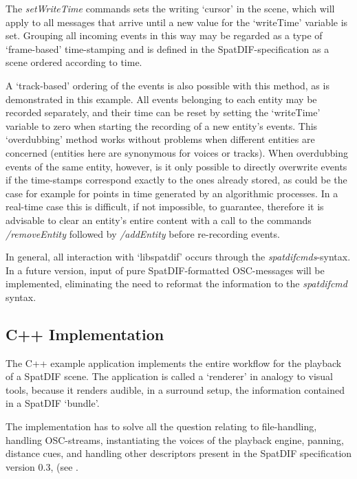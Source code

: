 \documentclass{article}
\begin{document}
The \emph{setWriteTime} commands sets the writing `cursor' in the scene, which will apply to all messages that arrive until a new value for the `writeTime' variable is set.
Grouping all incoming events in this way may be regarded as a type of `frame-based' time-stamping and is defined in the SpatDIF-specification as a scene ordered according to time.

A `track-based' ordering of the events is also possible with this method, as is demonstrated in this example.
All events belonging to each entity may be recorded separately, and their time can be reset by setting the `writeTime' variable to zero when starting the recording of a new entity's events.
This `overdubbing' method works without problems when different entities are concerned (entities here are synonymous for voices or tracks).
When overdubbing events of the same entity, however, is it only possible to directly overwrite events if the time-stamps correspond exactly to the ones already stored, as could be the case for example for points in time generated by an algorithmic processes. 
In a real-time case this is difficult, if not impossible, to guarantee, therefore it is advisable to clear an entity's entire content with a call to the commands \emph{/removeEntity} followed by \emph{/addEntity} before re-recording events.

In general, all interaction with `libspatdif' occurs through the \emph{spatdifcmds}-syntax.
In a future version, input of pure SpatDIF-formatted OSC-messages will be implemented, eliminating the need to reformat the information to the \emph{spatdifcmd} syntax.

\subsection{C++ Implementation}\label{subsec:code_application}

The C++ example application implements the entire workflow for the playback of a SpatDIF scene. 
The application is called a `renderer' in analogy to visual tools, because it renders audible, in a surround setup, the information contained in a SpatDIF `bundle'.

The implementation has to solve all the question relating to file-handling, handling OSC-streams, instantiating the voices of the playback engine, panning, distance cues, and handling other descriptors present in the SpatDIF specification version 0.3, (see \cite{SpatDIF_03}.
% 
\end{document}
